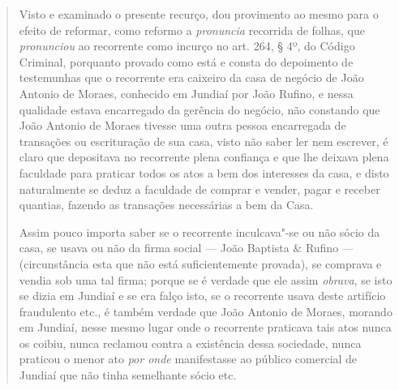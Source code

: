 \begin{quote}
Visto e examinado o presente recurço, dou provimento ao mesmo para o
efeito de reformar, como reformo a \emph{pronuncia} recorrida de folhas,
que \emph{pronunciou} ao recorrente como incurço no art. 264, § 4º, do
Código Criminal, porquanto provado como está e consta do depoimento de
testemunhas que o recorrente era caixeiro da casa de negócio de João
Antonio de Moraes, conhecido em Jundiaí por João Rufino, e nessa
qualidade estava encarregado da gerência do negócio, não constando que
João Antonio de Moraes tivesse uma outra pessoa encarregada de
transações ou escrituração de sua casa, visto não saber ler nem
escrever, é claro que depositava no recorrente plena confiança e que lhe
deixava plena faculdade para praticar todos os atos a bem dos interesses
da casa, e disto naturalmente se deduz a faculdade de comprar e vender,
pagar e receber quantias, fazendo as transações necessárias a bem da
Casa.

Assim pouco importa saber se o recorrente inculcava"-se ou não sócio da
casa, se usava ou não da firma social --- João Baptista \& Rufino ---
(circunstância esta que não está suficientemente provada), se comprava e
vendia sob uma tal firma; porque se é verdade que ele assim
\emph{obrava}, se isto se dizia em Jundiaí e se era falço isto, se o
recorrente usava deste artifício fraudulento etc., é também verdade que
João Antonio de Moraes, morando em Jundiaí, nesse mesmo lugar onde o
recorrente praticava tais atos nunca os coibiu, nunca reclamou contra a
existência dessa sociedade, nunca praticou o menor ato \emph{por onde}
manifestasse ao público comercial de Jundiaí que não tinha semelhante
sócio etc.


\end{quote}
